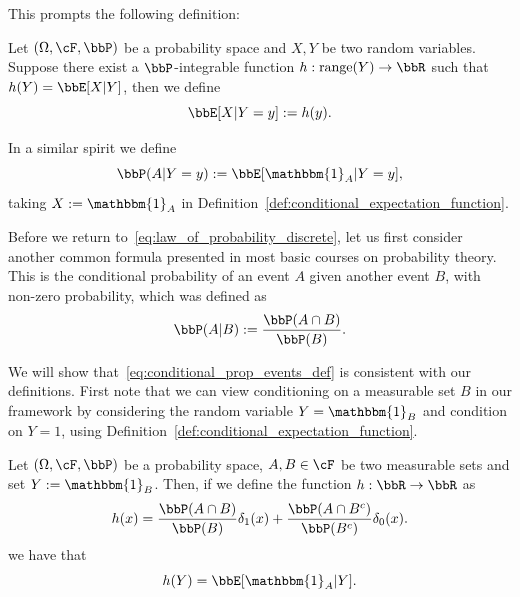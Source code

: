 This prompts the following definition:

\begin{definition}\label{def:conditional_expectation_function}
Let $(\Omega, \cF, \bbP)$ be a probability space and $X, Y$ be two random variables. Suppose there exist a $\bbP$-integrable function $h : \mathrm{range}(Y) \to \bbR$ such that $h(Y) = \bbE[X | Y]$, then we define
\[
	\bbE[X | Y = y] := h(y).
\]
\end{definition}

In a similar spirit we define
\[
	\bbP(A | Y = y) := \bbE[\mathbbm{1}_A | Y = y],
\]
taking $X := \mathbbm{1}_A$ in Definition~\ref{def:conditional_expectation_function}.

Before we return to~\eqref{eq:law_of_probability_discrete}, let us first consider another common formula presented in most basic courses on probability theory. This is the conditional probability of an event $A$ given another event $B$, with non-zero probability, which was defined as
\begin{equation}\label{eq:conditional_prop_events_def}
	\bbP(A|B) := \frac{\bbP(A \cap B)}{\bbP(B)}.
\end{equation}

We will show that~\eqref{eq:conditional_prop_events_def} is consistent with our definitions. First note that we can view conditioning on a measurable set $B$ in our framework by considering the random variable $Y = \mathbbm{1}_B$ and condition on $Y = 1$, using Definition~\ref{def:conditional_expectation_function}.

\begin{lemma}\label{lem:conditional_expectation_function}
Let $(\Omega, \cF, \bbP)$ be a probability space, $A, B \in \cF$ be two measurable sets and set $Y := \mathbbm{1}_B$. Then, if we define the function $h : \bbR \to \bbR$ as
\[
	h(x) = \frac{\bbP(A \cap B)}{\bbP(B)} \delta_{1}(x) + \frac{\bbP(A \cap B^c)}{\bbP(B^c)}\delta_{0}(x).
\]
we have that
\[
	h(Y) = \bbE[\mathbbm{1}_A | Y].
\]
\end{lemma}

